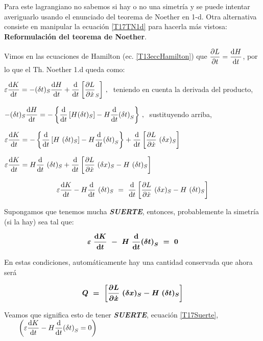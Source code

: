 Para este lagrangiano no sabemos si hay o no una simetría y se puede intentar averiguarlo usando el enunciado del teorema de Noether en 1-d. Otra alternativa consiste en manipular la ecuación \ref{T17TN1d} para hacerla más vistosa: \textbf{Reformulación del teorema de Noether}.


Vimos en las ecuaciones de Hamilton (ec. \ref{T13eccHamilton}) que $\displaystyle \-\pdv{L}{t}=\dv{H}{t}$, por lo que el Th. Noether 1.d queda como:

$\displaystyle \varepsilon \dv{K}{t}=-(\var t)_S \dv{H}{t}+\dv{t} \left[\pdv{L}{\dot x} (\var x)_S \right]\, , \ $ teniendo en cuenta la derivada del producto,

$-(\var t)_S \displaystyle \dv{H}{t}=-\left\{ \dv{t}\left[ H(\var t)_S \right] - H \dv{t} (\var t)_S \right\}\, , \ $ sustituyendo arriba,

$\displaystyle \varepsilon \dv{K}{t} =  -\left\{ \dv{t}\left[ H \ (\var t)_S \right] - H \dv{t} (\var t)_S \right\} + \dv{t} \left[ \pdv{L}{\dot x} \  (\var x)_S \right]$

$\displaystyle \varepsilon \dv{K}{t} = H \dv{t} \ (\var t)_S + \dv{t} \left[ \pdv{L}{\dot x} \ (\var x)_S - H\ (\var t)_S \right] $

\begin{equation}
\label{T17TNReform1}
\displaystyle \varepsilon \dv{K}{t} - H \dv{t} \ (\var t)_S \ = \  \dv{t} \left[ \pdv{L}{\dot x} \ (\var x)_S - H\ (\var t)_S \right]	
\end{equation}

\vspace{3mm}
 Supongamos que tenemos mucha \textbf{\emph{SUERTE}}, entonces, probablemente la simetría (si la hay) sea tal que: 
 
 \begin{equation}
 \label{T17Suerte}
  \boldsymbol{\varepsilon \ \dv{K}{t} \ - \ H \ \dv{t}(\var t)_S \ = \ 0}	
 \end{equation}

En estas condiciones, automáticamente hay una cantidad conservada que ahora será

 \begin{equation}
 \label{T17SuerteQ}
  \boldsymbol{Q \ = \ \left[ \pdv{L}{\dot x} \ (\var x)_S - H\ (\var t)_S \right]}	
 \end{equation} 
 
 \vspace{3mm} Veamos que significa esto de tener  \textbf{\emph{SUERTE}}, ecuación \ref{T17Suerte}, \textcolor{gris}{$\qquad \displaystyle   \left( \varepsilon \dv{K}{t}  -  H  \dv{t}(\var t)_S  =  0 \right)$}
 
